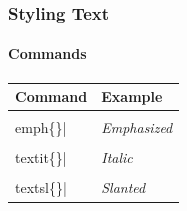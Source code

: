 \begin{frame}
    \frametitle{Styling Text}
    \framesubtitle{Commands}
    \begin{center}
    \begin{tabular}{@{}l l@{}}
        \textbf{Command}
        & \textbf{Example}\\
    \toprule[1.2pt]
        \lstinline|\\emph\{\}|          
        & \emph{Emphasized}\\
    \midrule%
        \lstinline|\\textit\{\}|       
        & \textit{Italic}\\
    \midrule
        \lstinline|\\textsl\{\}|       
        & \textsl{Slanted}\\

\end{tabular}
\end{center}
\end{frame}
